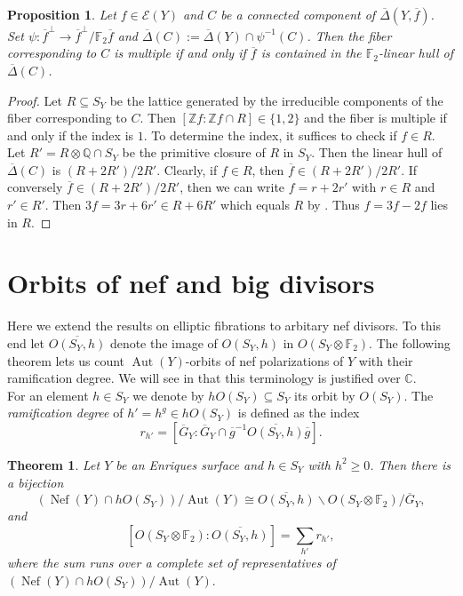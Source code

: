 \documentclass{amsart}
\theoremstyle{definition}
\theoremstyle{plain}
\newtheorem{theorem}[definition]{Theorem}
\newtheorem{proposition}[definition]{Proposition}
\DeclareMathOperator{\Nef}{Nef}
\DeclareMathOperator{\Aut}{Aut}
\newcommand{\QQ}{\mathbb{Q}}
\newcommand{\FF}{\mathbb{F}}
\newcommand{\CC}{\mathbb{C}}
\newcommand{\ZZ}{\mathbb{Z}}
\newcommand{\E}{\mathcal{E}}
\newcommand{\Gbar}{\overline{G}}
\begin{document}
\begin{proposition}\label{prop:multiple}
Let $f \in \E(Y)$ and $C$ be a connected component of $\overline{\Delta}(Y, \overline{f})$.
Set
$\psi \colon \overline{f}^\perp \to \overline{f}^\perp / \FF_2 \overline{f}$ and
 $\overline{\Delta}(C) := \overline{\Delta}(Y) \cap \psi^{-1}(C)$.
Then the fiber corresponding to $C$ is multiple if and only if
$\overline{f}$ is contained in the $\FF_2$-linear hull of $\overline{\Delta}(C)$.
\end{proposition}
\begin{proof}
 Let $R \subseteq S_Y$ be the lattice generated by the irreducible components of the fiber corresponding to $C$. Then $[\ZZ f : \ZZ f \cap R] \in \{1, 2\}$ and the fiber is multiple if and only if
 the index is $1$. To determine the index, it suffices to check if $f \in R$.
 Let $R' = R \otimes \QQ \cap S_Y$ be the primitive closure of $R$ in $S_Y$.
 Then the linear hull of $\overline{\Delta}(C)$ is $(R+2R')/2R'$.
 Clearly, if $f \in R$, then $\overline{f} \in (R+2R')/2R'$. If conversely $\overline{f} \in (R+2R')/2R'$,
 then we can write \(f = r + 2r'\) with $r \in R$ and $r' \in R'$.
 Then \(3f = 3r + 6r' \in R+6R'\) which equals \(R\) by . Thus \(f = 3f - 2f\) lies in \(R\).
\end{proof}

\section{Orbits of nef and big divisors}

Here we extend the results on elliptic fibrations to arbitary nef divisors.
To this end let $\overline{O(S_Y,h)}$ denote the image of $O(S_Y,h)$ in $O(S_Y\otimes \FF_2)$. The following theorem lets us count
$\Aut(Y)$-orbits of nef polarizations of $Y$ with their ramification degree. We will see in  that this terminology is justified over $\CC$.\\

For an element  $h\in S_Y$ we denote by $hO(S_Y)\subseteq S_Y$ its orbit by $O(S_Y)$. The \emph{ramification degree} of $h'=h^g \in hO(S_Y)$ is defined as the index
\[r_{h'} = \left[\Gbar_Y \colon \Gbar_Y \cap \overline{g}^{-1}\overline{O(S_Y,h)}\overline{g}\right].\]

\begin{theorem}\label{thm:fiber_charp}
Let $Y$ be an Enriques surface and $h \in S_Y$ with $h^2\geq 0$.
Then there is a bijection
\[\left(\Nef(Y)\cap hO(S_Y)\right) / \Aut(Y) \cong \overline{O(S_Y,h)}\backslash O(S_Y\otimes \FF_2)/\Gbar_Y,\]
and
\[\left[O(S_Y\otimes \FF_2):\overline{O(S_Y,h)}\right]= \sum_{h'}r_{h'},\]
where the sum runs over a complete set of representatives of $\left(\Nef(Y)\cap hO(S_Y)\right)/\Aut(Y).$
\end{theorem}
\end{document}
